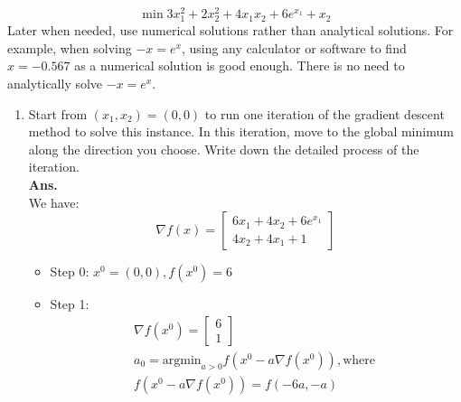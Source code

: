 \documentclass[12pt]{article}
\begin{document}
\begin{enumerate}
\begin{equation*}
                  \min 3x_1^2 + 2x_2^2 + 4x_1x_2 +6e^{x_1}+x_2
            \end{equation*}
            Later when needed, use numerical solutions rather than analytical solutions. For example, when solving $-x = e^x$, using any calculator or software to find $x = -0.567$ as a numerical solution is good enough. There is no need to analytically solve $-x = e^x$.
            \begin{enumerate}
                  \item Start from $(x_1,x_2) = (0,0)$ to run one iteration of the gradient descent method to solve this instance. In this iteration, move to the global minimum along the direction you choose. Write down the detailed process of the iteration.\\
                        \textbf{Ans.}\\
                        We have:
                        \begin{equation*}
                              \nabla f(x) = \begin{bmatrix}
                                    6x_1+4x_2 + 6e^{x_1} \\
                                    4x_2+ 4x_1+1
                              \end{bmatrix}
                        \end{equation*}
                        \begin{itemize}
                              \item Step 0: $x^0 = (0,0), f(x^0) = 6$
                              \item Step 1:
                                    \begin{align*}
                                           & \nabla f(x^0) = \begin{bmatrix}
                                                                   6 \\
                                                                   1
                                                             \end{bmatrix}
                                           &                                                                        \\
                                           & a_0 =           \text{argmin}_{a>0}f(x^0-a\nabla f(x^0)),\text{where } \\
                                           & f(x^0-a\nabla f(x^0)) = f(-6a,-a)                                      \\

\end{align*}
\end{itemize}
\end{enumerate}
\end{enumerate}
\end{document}
